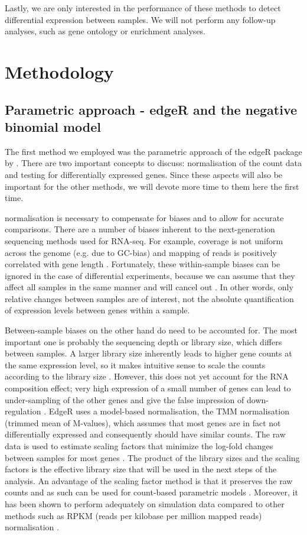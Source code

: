 \documentclass[a4paper,10pt]{article}\usepackage[]{graphicx}\usepackage[]{color}
\begin{document}
Lastly, we are only interested in the performance of these methods to detect differential expression between samples. We will not perform any follow-up analyses, such as gene ontology or enrichment analyses.

\section{Methodology}
\subsection{Parametric approach -  edgeR and the negative binomial model}
The first method we employed was the parametric approach of the edgeR package by \textcite{robinson_edger_2010}. There are two important concepts to discuss: normalisation of the count data and testing for differentially expressed genes. Since these aspects will also be important for the other methods, we will devote more time to them here the first time.

normalisation is necessary to compensate for biases and to allow for accurate comparisons. There are a number of biases inherent to the next-generation sequencing methods used for RNA-seq. For example, coverage is not uniform across the genome (e.g. due to GC-bias) and mapping of reads is positively correlated with gene length \autocite{soneson_comparison_2013}. Fortunately, these within-sample biases can be ignored in the case of differential experiments, because we can assume that they affect all samples in the same manner and will cancel out \autocite{chen_edger_2015}. In other words, only relative changes between samples are of interest, not the absolute quantification of expression levels between genes within a sample.

Between-sample biases on the other hand do need to be accounted for. The most important one is probably the sequencing depth or library size, which differs between samples. A larger library size inherently leads to higher gene counts at the same expression level, so it makes intuitive sense to scale the counts according to the library size \autocite{soneson_comparison_2013}. However, this does not yet account for the RNA composition effect; very high expression of a small number of genes can lead to under-sampling of the other genes and give the false impression of down-regulation \autocite{chen_edger_2015}. EdgeR uses a model-based normalisation, the TMM normalisation (trimmed mean of M-values), which assumes that most genes are in fact not differentially expressed and consequently should have similar counts. The raw data is used to estimate scaling factors that minimize the log-fold changes between samples for most genes \autocite{robinson_scaling_2010}. The product of the library sizes and the scaling factors is the effective library size that will be used in the next steps of the analysis. An advantage of the scaling factor method is that it preserves the raw counts and as such can be used for count-based parametric models \autocite{oshlack_rnaseq_2010}. Moreover, it has been shown to perform adequately on simulation data compared to other methods such as RPKM (reads per kilobase per million mapped reads) normalisation \autocite{dillies_comprehensive_2013}.
\end{document}
